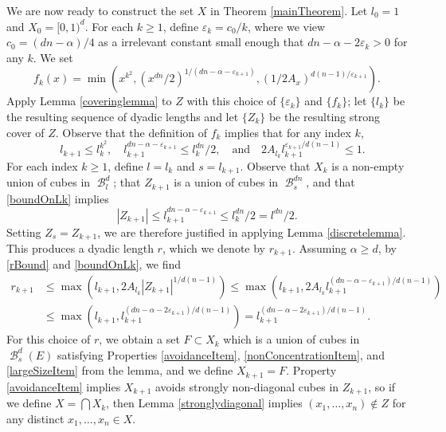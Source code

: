 \documentclass[dvipsnames,letterpaper,12pt]{article}
\numberwithin{equation}{section}
\theoremstyle{plain}
\DeclareMathOperator{\B}{\mathcal{B}}
\begin{document}
We are now ready to construct the set $X$ in Theorem \ref{mainTheorem}. Let $l_0 = 1$ and $X_0 = [0,1)^d$. For each $k \geq 1$, define $\varepsilon_k = c_0/k$, where we view $c_0 = (dn - \alpha)/4$ as a irrelevant constant small enough that $dn - \alpha - 2\varepsilon_k > 0$ for any $k$. We set
%
\[	f_k(x) = \min \left( x^{k^2}, (x^{dn}/2)^{1/(dn - \alpha - \varepsilon_{k+1})}, (1/2A_x)^{d(n-1)/\varepsilon_{k+1}} \right). \]
%
Apply Lemma \ref{coveringlemma} to $Z$ with this choice of $\{\varepsilon_k\}$ and $\{ f_k \}$; let $\{ l_k \}$ be the resulting sequence of dyadic lengths and let $\{Z_k\}$ be the resulting strong cover of $Z$. Observe that the definition of $f_k$ implies that for any index $k$,
%
\begin{equation} \label{boundOnLk}
	\quad l_{k+1} \leq l_k^{k^2}, \quad l_{k+1}^{dn - \alpha - \varepsilon_{k+1}} \leq l_k^{dn}/2, \quad \text{and} \quad 2A_{l_k} l_{k+1}^{\varepsilon_{k+1}/d(n-1)} \leq 1.
\end{equation}
%
For each index $k \geq 1$, define $l = l_k$ and $s = l_{k+1}$. Observe that $X_k$ is a non-empty union of cubes in $\B^d_l$; that $Z_{k+1}$ is a union of cubes in $\B^{dn}_s$, and that \eqref{boundOnLk} implies
%
\[ |Z_{k+1}| \leq l_{k+1}^{dn - \alpha - \varepsilon_{k+1}} \leq l_k^{dn}/2 = l^{dn}/2. \]
%
Setting $Z_s = Z_{k+1}$, we are therefore justified in applying Lemma \ref{discretelemma}. This produces a dyadic length $r$, which we denote by $r_{k+1}$. Assuming
$\alpha \geq d$, by \eqref{rBound} and \eqref{boundOnLk}, we find
%
\begin{equation} \label{rKBound}
\begin{aligned}
	r_{k+1} &\leq \max \left(l_{k+1}, 2 A_{l_k} |Z_{k+1}|^{1/d(n-1)} \right) \leq \max \left(l_{k+1}, 2 A_{l_k} l_{k+1}^{(dn - \alpha - \varepsilon_{k+1})/d(n-1)} \right)\\
	&\leq \max \left(l_{k+1}, l_{k+1}^{(dn - \alpha - 2\varepsilon_{k+1})/d(n-1)} \right) = l_{k+1}^{(dn - \alpha - 2\varepsilon_{k+1})/d(n-1)}.
\end{aligned}
\end{equation}
%
For this choice of $r$, we obtain a set $F \subset X_k$ which is a union of cubes in $\B^d_s(E)$ satisfying Properties \ref{avoidanceItem}, \ref{nonConcentrationItem}, and \ref{largeSizeItem} from the lemma, and we define $X_{k+1} = F$. Property \ref{avoidanceItem} implies $X_{k+1}$ avoids strongly non-diagonal cubes in $Z_{k+1}$, so if we define $X = \bigcap X_k$, then Lemma \ref{stronglydiagonal} implies $(x_1, \dots, x_n) \not \in Z$ for any distinct $x_1, \dots, x_n \in X$.
\end{document}
